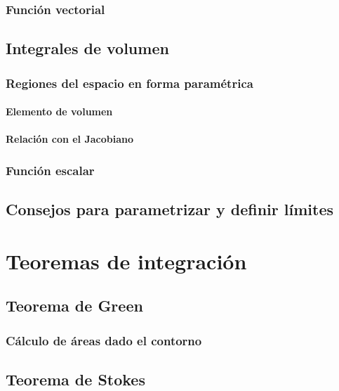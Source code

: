 \documentclass[12pt, fleqn]{report}                             %
\theoremstyle{break}                                            %
\begin{document}
            \subsection{Función vectorial}
        
        \section{Integrales de volumen}
        
            \subsection{Regiones del espacio en forma paramétrica}
            
                \subsubsection{Elemento de volumen}
                
                \subsubsection{Relación con el Jacobiano}
        
            \subsection{Función escalar}
            
        \section{Consejos para parametrizar y definir límites}
    
    \chapter{Teoremas de integración}
    
        \section{Teorema de Green}
        
            \subsection{Cálculo de áreas dado el contorno}
        
        \section{Teorema de Stokes}
        
\end{document}
